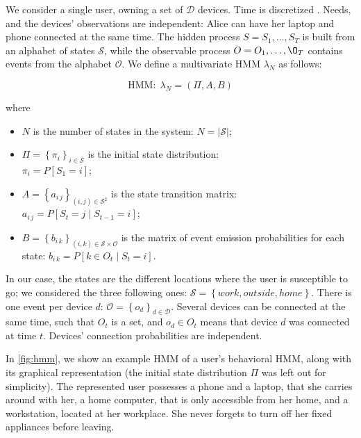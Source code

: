 We consider a single user, owning a set of $\mathcal{D}$ devices.
Time is discretized . Needs, and the devices' observations are independent: Alice can have her laptop and phone connected at the same time.
The hidden process $S=S_1,\dots,S_T$ is built from an alphabet of states $\mathcal{S}$, while the observable process $O=O_1, \dots, \O_T$ contains events from the alphabet $\mathcal{O}$. We define a multivariate HMM $\lambda_N$ as follows:

$$\text{HMM}:\;\lambda_N=(\Pi, A, B)$$

where 
\begin{itemize}
	\item $N$ is the number of states in the system:
	$N = \left| \mathcal{S} \right|$;

	\item $\Pi=\left\{ \pi_i\right\}_{i\in\mathcal{S}}$ is the initial state distribution:\\
	$\pi_i=P[S_1=i]$;

	\item $A = \left\{ a_{i\,j}\right\}_{(i,j)\in\mathcal{S}^2}$ is the state transition matrix:\\
	$a_{i\,j}=P[S_t=j \mid S_{t-1}=i]$;

	\item $B = \left\{ b_{i\,k}\right\}_{(i,k)\in\mathcal{S}\times\mathcal{O}}$ is the matrix of event emission probabilities for each state:
	$b_{i\,k} = P[ k \in O_t \mid S_t = i]$.
\end{itemize}

In our case, the states are the different locations where the user is susceptible to go;
we considered the three following ones: $\mathcal{S}=\left\{ \mathit{work}, \mathit{outside}, \mathit{home} \right\}$. 
There is one event per device $d$: $\mathcal{O} = \left\{ o_d \right\}_{d\in \mathcal{D}}$. Several devices can be connected at the same time, such that $O_t$ is a set, and $o_d \in O_t$ means that device $d$ was connected at time $t$. Devices' connection probabilities are independent.

In \cref{fig:hmm}, we show an example HMM of a user's behavioral HMM, along with its graphical representation (the initial state distribution $\Pi$ was left out for simplicity). 
The represented user possesses a phone and a laptop, that she carries around with her, a home computer, that is only accessible from her home, and a workstation, located at her workplace. She never forgets to turn off her fixed appliances before leaving.

